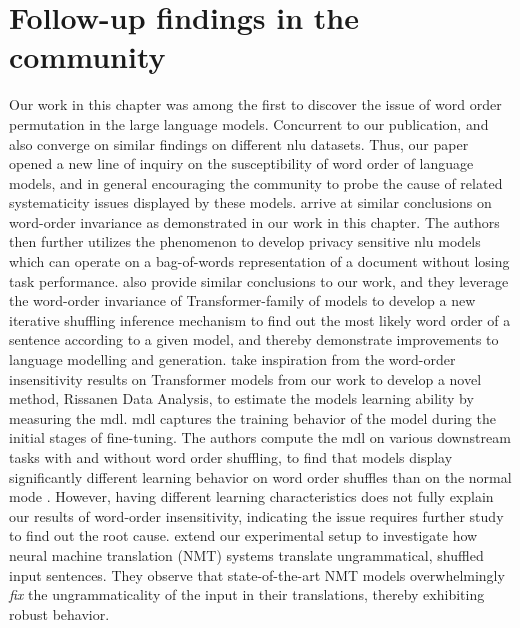 \documentclass[letterpaper, 12pt]{report}
\begin{document}
\section{Follow-up findings in the community}
\label{sec:unli_followup}

Our work in this chapter was among the first to discover the issue of word order permutation in the large language models. Concurrent to our publication, \citet{gupta-etal-2021-bert} and \citet{pham-etal-2020-out} also converge on similar findings on different \acrshort{nlu} datasets. Thus, our paper opened a new line of inquiry on the susceptibility of word order of language models, and in general encouraging the community to probe the cause of related systematicity issues displayed by these models.
\citet{hessel-schofield-2021-effective} arrive at similar conclusions on word-order invariance as demonstrated in our work in this chapter. The authors then further utilizes the phenomenon to develop privacy sensitive \acrshort{nlu} models which can operate on a bag-of-words representation of a document without losing task performance.
\citet{Malkin2021StudyingWO} also provide similar conclusions to our work, and they leverage the word-order invariance of Transformer-family of models to develop a new iterative shuffling inference mechanism to find out the most likely word order of a sentence according to a given model, and thereby demonstrate improvements to language modelling and generation.
\citet{perez2021} take inspiration from the word-order insensitivity results on Transformer models from our work to develop a novel method, Rissanen Data Analysis, to estimate the models learning ability by measuring the \acrfull{mdl}. \acrshort{mdl} captures the training behavior of the model during the initial stages of fine-tuning. The authors compute the \acrshort{mdl} on various downstream tasks with and without word order shuffling, to find that models display significantly different learning behavior on word order shuffles than on the normal mode \citep[Section 4.3.4, pp. 8.][]{Perez2021RissanenDA}. However, having different learning characteristics does not fully explain our results of word-order insensitivity, indicating the issue requires further study to find out the root cause.
\citet{parthasarathi-etal-2021-sometimes-want} extend our experimental setup to investigate how neural machine translation (NMT) systems translate ungrammatical, shuffled input sentences. They observe that state-of-the-art NMT models overwhelmingly \textit{fix} the ungrammaticality of the input in their translations, thereby exhibiting robust behavior.
\end{document}
